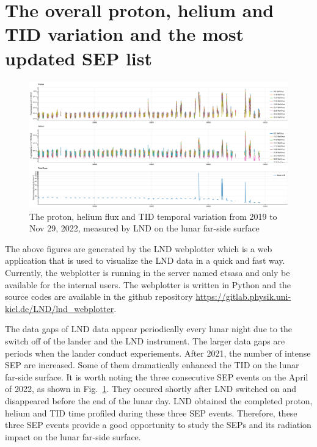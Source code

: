\section{The overall proton, helium and TID variation and the most updated SEP list}

\begin{figure}
    \centering
    \includegraphics[angle = 90, width =\textwidth, height = \textheight]{images/LND-proton-helium-TID.png}
    \caption[The overview of proton, helium flux and \ac{TID} measured by \ac{LND}]{The proton, helium flux and \ac{TID} temporal variation from 2019 to Nov 29, 2022, measured by \ac{LND} on the lunar far-side surface}
    \label{Fig:appendix_LND_proton_helium_TID}
\end{figure}
\clearpage
The above figures are generated by the \ac{LND} webplotter which is a web application that is used to visualize the \ac{LND} data in a quick and fast way. 
Currently, the webplotter is running in the server named etsasa and only be available for the internal users.
The webplotter is written in Python and the source codes are available in the github repository \url{https://gitlab.physik.uni-kiel.de/LND/lnd_webplotter}.

The data gaps of \ac{LND} data appear periodically every lunar night due to the switch off of the lander and  the \ac{LND} instrument. The larger data gaps are periods when the lander conduct experiements. After 2021, the number of intense \ac{SEP} are increased. Some of them dramatically enhanced the \ac{TID} on the lunar far-side surface. It is worth noting the three consecutive \ac{SEP} events on the April of 2022, as shown in Fig.~\ref{Fig:appendix_LND_proton_helium_TID}. They occured shortly after \ac{LND} switched on and disappeared before the end of the lunar day. \ac{LND} obtained the completed proton, helium and \ac{TID} time profiled during these three \ac{SEP} events. Therefore, these three \ac{SEP} events provide a good opportunity to study the \acp{SEP} and its radiation impact on the lunar far-side surface.

